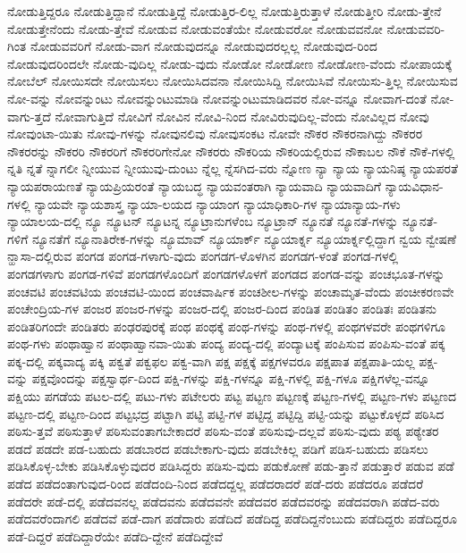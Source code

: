 {ನೋಡುತ್ತಿದ್ದರೂ
ನೋಡುತ್ತಿದ್ದಾನೆ
ನೋಡುತ್ತಿದ್ದೆ
ನೋಡುತ್ತಿರ-ಲಿಲ್ಲ
ನೋಡುತ್ತಿರುತ್ತಾಳೆ
ನೋಡುತ್ತೀರಿ
ನೋಡು-ತ್ತೇನೆ
ನೋಡುತ್ತೇನೆಂದು
ನೋಡು-ತ್ತೇವೆ
ನೋಡುವ
ನೋಡುವಂತೆಯೇ
ನೋಡುವರೋ
ನೋಡುವವನೋ
ನೋಡುವವರಿ-ಗಿಂತ
ನೋಡುವವರಿಗೆ
ನೋಡು-ವಾಗ
ನೋಡುವುದನ್ನೂ
ನೋಡುವುದರಲ್ಲಲ್ಲ
ನೋಡುವುದ-ರಿಂದ
ನೋಡುವುದರಿಂದಲೇ
ನೋಡು-ವುದಿಲ್ಲ
ನೋಡು-ವುದು
ನೋಡೋ
ನೋಡೋಣ
ನೋಡೋಣ-ವೆಂದು
ನೋಪಾಯಕ್ಕೆ
ನೋಬೆಲ್
ನೋಯಿಸದೇ
ನೋಯಿಸಲು
ನೋಯಿಸಿದವನಾ
ನೋಯಿಸಿದ್ದಿ
ನೋಯಿಸಿವೆ
ನೋಯಿಸು-ತ್ತಿಲ್ಲ
ನೋಯಿಸುವ
ನೋ-ವನ್ನು
ನೋವನ್ನುಂಟು
ನೋವನ್ನುಂಟುಮಾಡಿ
ನೋವನ್ನುಂಟುಮಾಡಿದವರ
ನೋ-ವನ್ನೂ
ನೋವಾಗ-ದಂತೆ
ನೋ-ವಾಗು-ತ್ತದೆ
ನೋವಾಗುತ್ತಿದೆ
ನೋವಿಗೆ
ನೋವಿನ
ನೋವಿ-ನಿಂದ
ನೋವಿರುವುದಿಲ್ಲ-ವೆಂದು
ನೋವಿಲ್ಲದ
ನೋವು
ನೋವುಂಟಾ-ಯಿತು
ನೋವು-ಗಳನ್ನು
ನೋವುನಲಿವು
ನೋವುಸಂಕಟ
ನೋವೇ
ನೌಕರ
ನೌಕರನಾಗಿದ್ದು
ನೌಕರರ
ನೌಕರರನ್ನು
ನೌಕರರಿ
ನೌಕರರಿಗೆ
ನೌಕರರಿಗೇನೋ
ನೌಕರರು
ನೌಕರಿಯ
ನೌಕರಿಯಲ್ಲಿರುವ
ನೌಕಾಬಲ
ನೌಕೆ
ನೌಕೆ-ಗಳಲ್ಲಿ
ನ್ನತಿ
ನ್ನತೆ
ನ್ನಾಗಲೀ
ನ್ನೀಯುವ
ನ್ನೀಯುವು-ದುಂಟು
ನ್ನೆಲ್ಲ
ನ್ನೆಸಗಿದ-ವರು
ನ್ನೋಣ
ನ್ಯಾ
ನ್ಯಾಯ
ನ್ಯಾಯನಿಷ್ಠ
ನ್ಯಾಯಪರತೆ
ನ್ಯಾಯಪರಾಯಣತೆ
ನ್ಯಾಯಪ್ರಿಯರಂತೆ
ನ್ಯಾಯಬದ್ಧ
ನ್ಯಾಯವಂತರಾಗಿ
ನ್ಯಾಯವಾದಿ
ನ್ಯಾಯವಾದಿಗೆ
ನ್ಯಾಯವಿಧಾನ-ಗಳಲ್ಲಿ
ನ್ಯಾಯವೇ
ನ್ಯಾಯಶಾಸ್ತ್ರ
ನ್ಯಾಯಾ-ಲಯದ
ನ್ಯಾಯಾಂಗ
ನ್ಯಾಯಾಧಿಕಾರಿ-ಗಳ
ನ್ಯಾಯಾನ್ಯಾಯ-ಗಳು
ನ್ಯಾಯಾಲಯ-ದಲ್ಲಿ
ನ್ಯೂ
ನ್ಯೂಟನ್
ನ್ಯೂಟನ್ನ
ನ್ಯೂಟ್ರಾನುಗಳೆಂಬ
ನ್ಯೂಟ್ರಾನ್
ನ್ಯೂನತೆ
ನ್ಯೂನತೆ-ಗಳನ್ನು
ನ್ಯೂನತೆ-ಗಳಿಗೆ
ನ್ಯೂನತೆಗೆ
ನ್ಯೂನಾತಿರೇಕ-ಗಳನ್ನು
ನ್ಯೂಮಾವ್
ನ್ಯೂಯಾರ್ಕ್
ನ್ಯೂಯಾರ್ಕ್ನ
ನ್ಯೂಯಾರ್ಕ್ನಲ್ಲಿದ್ದಾಗ
ನ್ವಯ
ನ್ವೇಷಣೆ
ನ್ಹಾಸಾ-ದಲ್ಲಿರುವ
ಪಂಗಡ
ಪಂಗಡ-ಗಳಾಗು-ವುದು
ಪಂಗಡಗ-ಳೊಳಗಿನ
ಪಂಗಡಗ-ಳಂತೆ
ಪಂಗಡ-ಗಳಲ್ಲಿ
ಪಂಗಡಗಳಾಗು
ಪಂಗಡ-ಗಳಿವೆ
ಪಂಗಡಗಳೊಂದಿಗೆ
ಪಂಗಡಗಳೊಳಗೆ
ಪಂಗಡದ
ಪಂಗಡ-ವನ್ನು
ಪಂಚಭೂತ-ಗಳನ್ನು
ಪಂಚವಟಿ
ಪಂಚವಟಿಯ
ಪಂಚವಟಿ-ಯಿಂದ
ಪಂಚವಾರ್ಷಿಕ
ಪಂಚಶೀಲ-ಗಳನ್ನು
ಪಂಚಾಮೃತ-ವೆಂದು
ಪಂಚೀಕರಣವೇ
ಪಂಚೇಂದ್ರಿಯ-ಗಳ
ಪಂಜರ
ಪಂಜರ-ಗಳನ್ನು
ಪಂಜರ-ದಲ್ಲಿ
ಪಂಜರ-ದಿಂದ
ಪಂಡಿತ
ಪಂಡಿತಂ
ಪಂಡಿತಃ
ಪಂಡಿತನು
ಪಂಡಿತರಿಗಂದೇ
ಪಂಡಿತರು
ಪಂಢರಪುರಕ್ಕೆ
ಪಂಥ
ಪಂಥಕ್ಕೆ
ಪಂಥ-ಗಳನ್ನು
ಪಂಥ-ಗಳಲ್ಲಿ
ಪಂಥಗಳವರೇ
ಪಂಥಗಳಿಗೂ
ಪಂಥ-ಗಳು
ಪಂಥಾಹ್ವಾನ
ಪಂಥಾಹ್ವಾನವಾ-ಯಿತು
ಪಂದ್ಯ
ಪಂದ್ಯ-ದಲ್ಲಿ
ಪಂದ್ಯಾಟಕ್ಕೆ
ಪಂಪಿಸುವ
ಪಂಪಿಸು-ವಂತೆ
ಪಕ್ಕ
ಪಕ್ಕ-ದಲ್ಲಿ
ಪಕ್ಕವಾದ್ಯ
ಪಕ್ಕಿ
ಪಕ್ವತೆ
ಪಕ್ವಫಲ
ಪಕ್ವ-ವಾಗಿ
ಪಕ್ಷ
ಪಕ್ಷಕ್ಕೆ
ಪಕ್ಷಗಳವರೂ
ಪಕ್ಷಪಾತ
ಪಕ್ಷಪಾತಿ-ಯಲ್ಲ
ಪಕ್ಷ-ವನ್ನು
ಪಕ್ಷವೊಂದನ್ನು
ಪಕ್ಷಸ್ವಾರ್ಥ-ದಿಂದ
ಪಕ್ಷಿ-ಗಳನ್ನು
ಪಕ್ಷಿ-ಗಳನ್ನೂ
ಪಕ್ಷಿ-ಗಳಲ್ಲಿ
ಪಕ್ಷಿ-ಗಳೂ
ಪಕ್ಷಿಗಳೆಲ್ಲ-ವನ್ನೂ
ಪಕ್ಷಿಯು
ಪಗಡೆಯ
ಪಟಲ-ದಲ್ಲಿ
ಪಟು-ಗಳು
ಪಟೇಲರು
ಪಟ್ಟ
ಪಟ್ಟಣ
ಪಟ್ಟಣಕ್ಕೆ
ಪಟ್ಟಣ-ಗಳಲ್ಲಿ
ಪಟ್ಟಣ-ಗಳು
ಪಟ್ಟಣದ
ಪಟ್ಟಣ-ದಲ್ಲಿ
ಪಟ್ಟಣ-ದಿಂದ
ಪಟ್ಟಭದ್ರ
ಪಟ್ಟಾಗಿ
ಪಟ್ಟಿ
ಪಟ್ಟಿ-ಗಳ
ಪಟ್ಟಿದ್ದ
ಪಟ್ಟಿದ್ದಿ
ಪಟ್ಟಿ-ಯನ್ನು
ಪಟ್ಟುಕೊಳ್ಳದೆ
ಪಠಿಸಿದ
ಪಠಿಸು-ತ್ತವೆ
ಪಠಿಸುತ್ತಾಳೆ
ಪಠಿಸುವಂತಾಗಬೇಕಾದರೆ
ಪಠಿಸು-ವಂತೆ
ಪಠಿಸುವು-ದಲ್ಲವೆ
ಪಠಿಸು-ವುದು
ಪಠ್ಯ
ಪಠ್ಯೇತರ
ಪಡದೆ
ಪಡದೇ
ಪಡ-ಬಹುದು
ಪಡಬಾರದ
ಪಡಬೇಕಾಗು-ವುದು
ಪಡಬೇಕಿಲ್ಲ
ಪಡಿಗೆ
ಪಡಿಸ-ಬಹುದು
ಪಡಿಸಲು
ಪಡಿಸಿಕೊಳ್ಳ-ಬೇಕು
ಪಡಿಸಿಕೊಳ್ಳುವುದರ
ಪಡಿಸಿದ್ದರು
ಪಡಿಸು-ವುದು
ಪಡುಕೋಣೆ
ಪಡು-ತ್ತಾನೆ
ಪಡುತ್ತಾರೆ
ಪಡುವ
ಪಡೆ
ಪಡೆದ
ಪಡೆದಂತಾಗುವುದ-ರಿಂದ
ಪಡೆದಂದಿ-ನಿಂದ
ಪಡೆದದ್ದಲ್ಲ
ಪಡೆದರಾದರೆ
ಪಡೆ-ದರು
ಪಡೆದರೂ
ಪಡೆದರೆ
ಪಡೆದರೇ
ಪಡೆ-ದಲ್ಲಿ
ಪಡೆದವನಲ್ಲ
ಪಡೆದವನು
ಪಡೆದವನೇ
ಪಡೆದವರ
ಪಡೆದವರನ್ನು
ಪಡೆದವರಾಗಿ
ಪಡೆದ-ವರು
ಪಡೆದವರೆಂದಾಗಲಿ
ಪಡೆದವೆ
ಪಡೆ-ದಾಗ
ಪಡೆದಾರು
ಪಡೆದಿದೆ
ಪಡೆದಿದ್ದ
ಪಡೆದಿದ್ದನೆಂಬುದು
ಪಡೆದಿದ್ದರು
ಪಡೆದಿದ್ದರೂ
ಪಡೆ-ದಿದ್ದರೆ
ಪಡೆದಿದ್ದಾರೆಯೇ
ಪಡೆದಿ-ದ್ದೇನೆ
ಪಡೆದಿದ್ದೇವೆ
}
